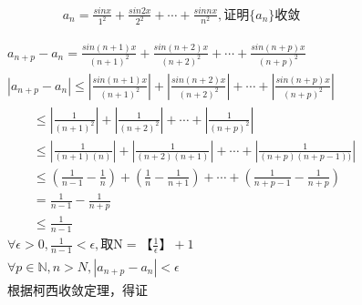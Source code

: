 \documentclass{ctexart}
\begin{document}
\fontsize{25.0pt}{\baselineskip}\selectfont

\fontsize{20.0pt}{\baselineskip}\selectfont
\begin{align*}
a_n =\frac{sinx}{1^2} + \frac{sin2x}{2^2} + \cdots + \frac{sinnx}{n^2},\mbox{证明}\{a_n\}\mbox{收敛}
\end{align*}

\newpage
{}
\fontsize{16.0pt}{\baselineskip}\selectfont


\begin{align*}
&a_{n+p} - a_n = \frac{sin(n+1)x}{(n+1)^2} + \frac{sin(n+2)x}{(n+2)^2} + \cdots + \frac{sin(n+p)x}{(n+p)^2}\\
&|a_{n+p} - a_n| \le |\frac{sin(n+1)x}{(n+1)^2}| + |\frac{sin(n+2)x}{(n+2)^2}| + \cdots + |\frac{sin(n+p)x}{(n+p)^2}|\\
&\quad\quad\le|\frac{1}{(n+1)^2}| + |\frac{1}{(n+2)^2}| + \cdots + |\frac{1}{(n+p)^2}|\\
&\quad\quad\le|\frac{1}{(n+1)(n)}| + |\frac{1}{(n+2)(n+1)}| + \cdots + |\frac{1}{(n+p)(n+p-1))}|\\
&\quad\quad\le(\frac{1}{n-1} - \frac{1}{n}) + (\frac{1}{n}-\frac{1}{n+1}) + \cdots + (\frac{1}{n+p-1} - \frac{1}{n+p})\\
&\quad\quad=\frac{1}{n-1} - \frac{1}{n+p}\\
&\quad\quad\le\frac{1}{n-1}\\
&\forall \epsilon > 0,\frac{1}{n-1} < \epsilon,\mbox{取N}=【\frac{1}{\epsilon}】+ 1\\
&\forall p \in \mathbb{N}, n>N, |a_{n+p} - a_n| < \epsilon\\
&\mbox{根据柯西收敛定理，得证}&
\end{align*}
\end{document}
